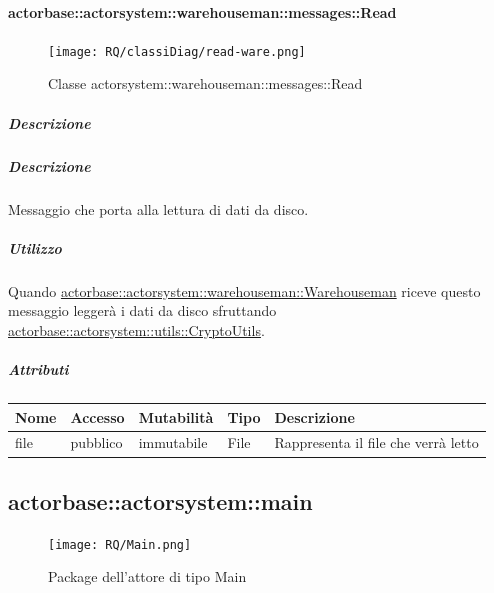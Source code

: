 \documentclass{scalatekids-article}
\begin{document}
\paragraph{actorbase::actorsystem::warehouseman::messages::Read}
\label{sec:actorbase::actorsystem::warehouseman::messages::Read}

\begin{figure}[H]
  \begin{center}
    \texttt{[image: RQ/classiDiag/read-ware.png]}
    \caption{Classe actorsystem::warehouseman::messages::Read}
  \end{center}
\end{figure}
\subparagraph{Descrizione}

\subparagraph{Descrizione}

Messaggio che porta alla lettura di dati da disco.

\subparagraph{Utilizzo}

Quando \hyperref[sec:actorbase::actorsystem::warehouseman::Warehouseman]{actorbase::actorsystem::warehouseman::Warehouseman}
riceve questo messaggio leggerà i dati da disco sfruttando
\hyperref[sec:actorbase::actorsystem::utils::CryptoUtils]{actorbase::actorsystem::utils::CryptoUtils}.

\subparagraph{Attributi}
\begin{tabular}{| p{3cm} | p{1.5cm} | p{2cm} | p{2cm} | p{8.5cm} |}
  \hline
  Nome & Accesso & Mutabilità & Tipo & Descrizione\\
  \hline
  file & pubblico & immutabile & File & Rappresenta il file che verrà letto \\
  \hline
\end{tabular}


\subsection{actorbase::actorsystem::main}
\label{sec:actorbase::actorsystem::main}

\begin{figure}[H]
  \begin{center}
    \texttt{[image: RQ/Main.png]}
    \caption{Package dell'attore di tipo Main}
  \end{center}
\end{figure}
\end{document}
